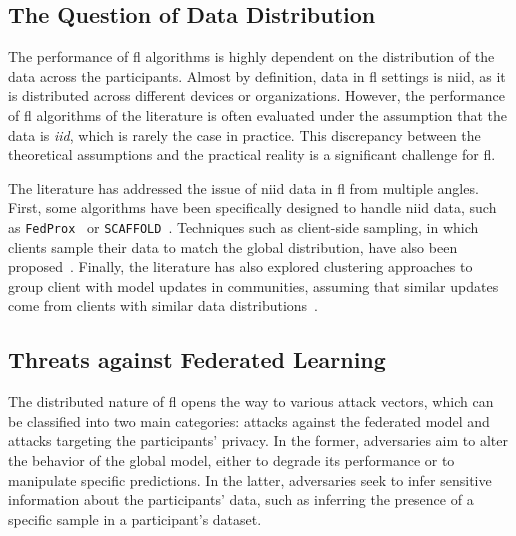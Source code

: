 \subsection{The Question of Data Distribution\label{sec:bg.fl.data}}


The performance of \gls{fl} algorithms is highly dependent on the distribution of the data across the participants.
Almost by definition, data in \gls{fl} settings is \gls{niid}, as it is distributed across different devices or organizations.
However, the performance of \gls{fl} algorithms of the literature is often evaluated under the assumption that the data is \emph{iid}, which is rarely the case in practice.
This discrepancy between the theoretical assumptions and the practical reality is a significant challenge for \gls{fl}.

The literature has addressed the issue of \gls{niid} data in \gls{fl} from multiple angles.
First, some algorithms have been specifically designed to handle \gls{niid} data, such as \texttt{FedProx}~\cite{li_FederatedOptimizationHeterogeneous_2020} or \texttt{SCAFFOLD}~\cite{karimireddy_SCAFFOLDStochasticControlled_2020}.
Techniques such as client-side sampling, in which clients sample their data to match the global distribution, have also been proposed~\cite{han_HeterogeneousDataAwareFederated_2024}.
Finally, the literature has also explored clustering approaches to group client with model updates in communities, assuming that similar updates come from clients with similar data distributions~\cite{ye_PFedSAPersonalizedFederated_2023}.


\subsection{Threats against Federated Learning\label{sec:bg.fl.threats}}


The distributed nature of \gls{fl} opens the way to various attack vectors, which can be classified into two main categories: attacks against the federated model and attacks targeting the participants' privacy.
In the former, adversaries aim to alter the behavior of the global model, either to degrade its performance or to manipulate specific predictions.
In the latter, adversaries seek to infer sensitive information about the participants' data, such as inferring the presence of a specific sample in a participant's dataset.

